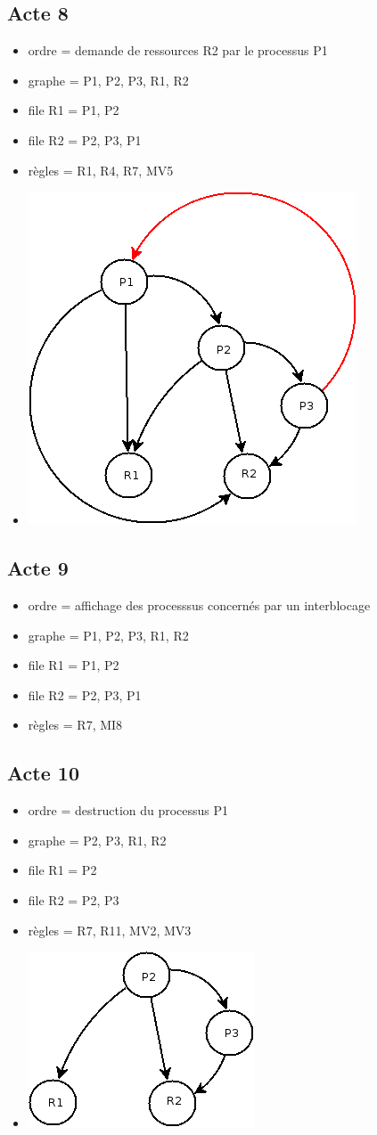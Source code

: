 \documentclass{article}
\newcommand{\bitem}{\item[\textbullet]}
\begin{document}
\subsection{Acte 8}
\begin{itemize}
  \bitem ordre = demande de ressources R2 par le processus P1
  \bitem graphe = P1, P2, P3, R1, R2
  \bitem file R1 = P1, P2
  \bitem file R2 = P2, P3, P1
  \bitem règles = R1, R4, R7, MV5
  \bitem \includegraphics[scale=0.5]{images/acte8}
\end{itemize}
\subsection{Acte 9}
\begin{itemize}
  \bitem ordre = affichage des processsus concernés par un interblocage
  \bitem graphe = P1, P2, P3, R1, R2
  \bitem file R1 = P1, P2
  \bitem file R2 = P2, P3, P1
  \bitem règles = R7, MI8
\end{itemize}
\subsection{Acte 10}
\begin{itemize}
  \bitem ordre = destruction du processus P1
  \bitem graphe = P2, P3, R1, R2
  \bitem file R1 = P2
  \bitem file R2 = P2, P3
  \bitem règles = R7, R11, MV2, MV3
  \bitem \includegraphics[scale=0.5]{images/acte10}
\end{itemize}
\end{document}
